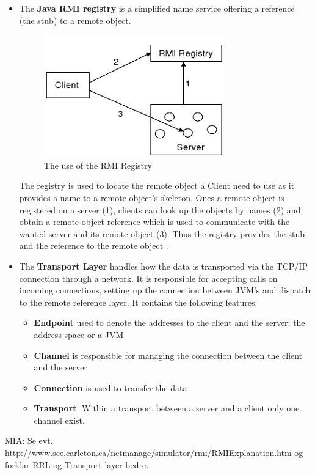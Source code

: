 \documentclass[Main]{subfiles}
\begin{document}
\begin{itemize}
\item The \textbf{Java RMI registry} is a simplified name service offering a reference (the stub) to a remote object.
\begin{figure}[H]
\centering
\includegraphics[scale=0.8]{Figurer/RMI-registry.png}
\caption{The use of the RMI Registry \cite{RMI-slides}}
\end{figure}
The registry is used to locate the remote object a Client need to use as it provides a name to a remote object's skeleton. Ones a remote object is registered on a server (1), clients can look up the objects by names (2) and obtain a remote object reference which is used to communicate with the wanted server and its remote object (3). Thus the registry provides the stub and the reference to the remote object \cite{Getting-started}.

\item The \textbf{Transport Layer} handles how the data is transported via the TCP/IP connection through a network. It is responsible for accepting calls on incoming connections, setting up the connection between JVM's and dispatch to the remote reference layer. It contains the following features:
\begin{itemize}
\item \textbf{Endpoint} used to denote the addresses to the client and the server; the address space or a JVM
\item \textbf{Channel} is responsible for managing the connection between the client and the server
\item \textbf{Connection} is used to transfer the data
\item \textbf{Transport}. Within a transport between a server and a client only one channel exist.
\end{itemize}

\setlength\parindent{300pt}\cite{RMI-slides}

\end{itemize}

MIA: Se evt. http://www.sce.carleton.ca/netmanage/simulator/rmi/RMIExplanation.htm og forklar RRL og Transport-layer bedre.
\end{document}
